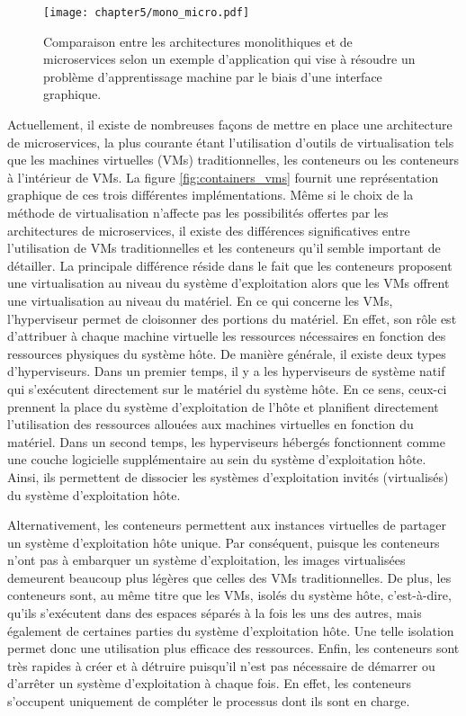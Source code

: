 \begin{figure}[H]
	\centering
	\texttt{[image: chapter5/mono\_micro.pdf]}
		\caption{Comparaison entre les architectures monolithiques et de microservices selon un exemple d'application qui vise à résoudre un problème d'apprentissage machine par le biais d'une interface graphique.}
	\label{fig:mono_micro}
\end{figure}

Actuellement, il existe de nombreuses façons de mettre en place une architecture de microservices, la plus courante étant l'utilisation d'outils de virtualisation tels que les machines virtuelles (\acsp{VM}) traditionnelles, les conteneurs ou les conteneurs à l'intérieur de \acsp{VM}. La figure \ref{fig:containers_vms} fournit une représentation graphique de ces trois différentes implémentations. Même si le choix de la méthode de virtualisation n'affecte pas les possibilités offertes par les architectures de microservices, il existe des différences significatives entre l'utilisation de \acsp{VM} traditionnelles et les conteneurs qu'il semble important de détailler. La principale différence réside dans le fait que les conteneurs proposent une virtualisation au niveau du système d'exploitation alors que les \acsp{VM} offrent une virtualisation au niveau du matériel. En ce qui concerne les \acsp{VM}, l'hyperviseur permet de cloisonner des portions du matériel. En effet, son rôle est d'attribuer à chaque machine virtuelle les ressources nécessaires en fonction des ressources physiques du système hôte. De manière générale, il existe deux types d'hyperviseurs. Dans un premier temps, il y a les hyperviseurs de système natif qui s'exécutent directement sur le matériel du système hôte. En ce sens, ceux-ci prennent la place du système d'exploitation de l'hôte et planifient directement l'utilisation des ressources allouées aux machines virtuelles en fonction du matériel. Dans un second temps, les hyperviseurs hébergés fonctionnent comme une couche logicielle supplémentaire au sein du système d'exploitation hôte. Ainsi, ils permettent de dissocier les systèmes d'exploitation invités (virtualisés) du système d'exploitation hôte.

Alternativement, les conteneurs permettent aux instances virtuelles de partager un système d'exploitation hôte unique. Par conséquent, puisque les conteneurs n'ont pas à embarquer un système d'exploitation, les images virtualisées demeurent beaucoup plus légères que celles des \acsp{VM} traditionnelles. De plus, les conteneurs sont, au même titre que les \acsp{VM}, isolés du système hôte, c'est-à-dire, qu'ils s'exécutent dans des espaces séparés à la fois les uns des autres, mais également de certaines parties du système d'exploitation hôte. Une telle isolation permet donc une utilisation plus efficace des ressources. Enfin, les conteneurs sont très rapides à créer et à détruire puisqu'il n'est pas nécessaire de démarrer ou d'arrêter un système d'exploitation à chaque fois. En effet, les conteneurs s'occupent uniquement de compléter le processus dont ils sont en charge.


